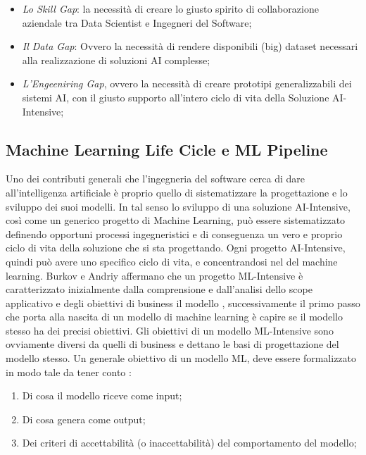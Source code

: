 \begin{itemize}
    \item \emph{Lo Skill Gap}: la necessità di creare lo giusto spirito di collaborazione aziendale tra Data Scientist e Ingegneri del Software;
    \item \emph{Il Data Gap}: Ovvero la necessità di rendere disponibili (big) dataset necessari alla realizzazione di soluzioni AI complesse;
    \item \emph{L'Engeeniring Gap}, ovvero la necessità di creare prototipi generalizzabili dei sistemi AI, con il giusto supporto all'intero ciclo di vita della Soluzione AI-Intensive;
\end{itemize}


\subsection{Machine Learning Life Cicle e ML Pipeline}
Uno dei contributi generali che l'ingegneria del software cerca di dare all'intelligenza artificiale è proprio quello di sistematizzare la progettazione e lo sviluppo dei suoi modelli. In tal senso lo sviluppo di una soluzione AI-Intensive, così come un generico progetto di Machine Learning, può essere sistematizzato definendo opportuni processi ingegneristici e di conseguenza un vero e proprio ciclo di vita della soluzione che si sta progettando. Ogni progetto AI-Intensive, quindi può avere uno specifico ciclo di vita, e concentrandosi nel del machine learning. Burkov e Andriy affermano che un progetto ML-Intensive è caratterizzato inizialmente dalla comprensione e dall'analisi dello scope applicativo e degli obiettivi di business il modello \cite{burkov2020machine}, successivamente il primo passo che porta alla nascita di un modello di machine learning è capire se il modello stesso ha dei precisi obiettivi. Gli obiettivi di un modello ML-Intensive sono ovviamente diversi da quelli di business e dettano le basi di progettazione del modello stesso. Un generale obiettivo di un modello ML, deve essere formalizzato in modo tale da tener conto \cite{burkov2020machine}:

\begin{enumerate}
    \item Di cosa il modello riceve come input;
    \item Di cosa genera come output;
    \item Dei criteri di accettabilità (o inaccettabilità) del comportamento del modello;
\end{enumerate}

